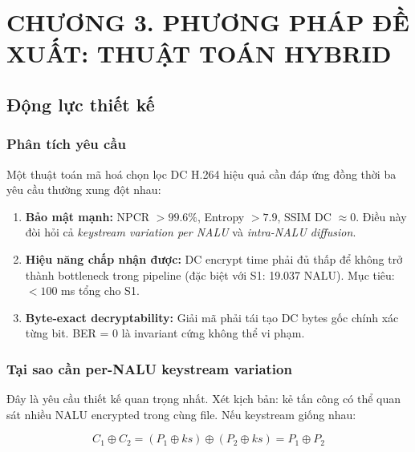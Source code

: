 \clearpage
{}
\section*{CHƯƠNG 3. PHƯƠNG PHÁP ĐỀ XUẤT: THUẬT TOÁN HYBRID}
\setcounter{section}{3}
\setcounter{subsection}{0}
\setcounter{figure}{0}
\setcounter{table}{0}
\setcounter{equation}{0}

\subsection{Động lực thiết kế}

\subsubsection{Phân tích yêu cầu}

Một thuật toán mã hoá chọn lọc DC H.264 hiệu quả cần đáp ứng đồng thời ba yêu cầu
thường xung đột nhau:

\begin{enumerate}
  \item \textbf{Bảo mật mạnh:} NPCR $> 99.6\%$, Entropy $> 7.9$, SSIM DC $\approx 0$.
        Điều này đòi hỏi cả \emph{keystream variation per NALU} và \emph{intra-NALU diffusion}.

  \item \textbf{Hiệu năng chấp nhận được:} DC encrypt time phải đủ thấp để
        không trở thành bottleneck trong pipeline (đặc biệt với S1: 19.037 NALU).
        Mục tiêu: $< 100$ ms tổng cho S1.

  \item \textbf{Byte-exact decryptability:} Giải mã phải tái tạo DC bytes gốc
        chính xác từng bit. BER = 0 là invariant cứng không thể vi phạm.
\end{enumerate}

\subsubsection{Tại sao cần per-NALU keystream variation}

Đây là yêu cầu thiết kế quan trọng nhất. Xét kịch bản: kẻ tấn công có thể
quan sát nhiều NALU encrypted trong cùng file. Nếu keystream giống nhau:

\begin{equation}
C_1 \oplus C_2 = (P_1 \oplus ks) \oplus (P_2 \oplus ks) = P_1 \oplus P_2
\end{equation}

